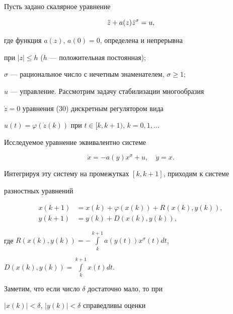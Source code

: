\begin{exam}


Пусть задано скалярное уравнение


\begin{equation}


\Ddot z+a(z) \Dot z{}^\sigma=u,


\end{equation}


где функция $a(z)$, $a(0)=0$, определена и непрерывна


при $|z|\leq h$ ($h$ --- положительная постоянная);


$\sigma$ --- рациональное число с нечетным знаменателем, $\sigma\geq 1$;


$u$ --- управление. Рассмотрим задачу стабилизации многообразия


$\Dot z=0$ уравнения (30) дискретным регулятором вида


$u(t)=\varphi(\Dot z(k))$ при $t\in [k, k+1)$, $k=0,1,\dotsc$





Исследуемое уравнение эквивалентно системе


\begin{equation}


\Dot x=-a(y) x^\sigma+u, \quad \Dot y=x.


\end{equation}


Интегрируя эту систему на промежутках $[k, k+1]$, приходим к системе


разностных уравнений


\begin{equation}


\begin{split}


x(k+1)&=x(k)+\varphi(x(k))+R(x(k),y(k)), \\


y(k+1)&=y(k)+D(x(k),y(k)),


\end{split}


\end{equation}


где $R(x(k),y(k))=-\int\limits_k^{k+1} a(y(t))x^\sigma(t) dt$,


$D(x(k),y(k))=\int\limits_k^{k+1} x(t) dt$.


Заметим, что если число $\delta$ достаточно мало, то при


$|x(k)|{<}\delta$, $|y(k)|{<}\delta$ справедливы оценки



\end{exam}
